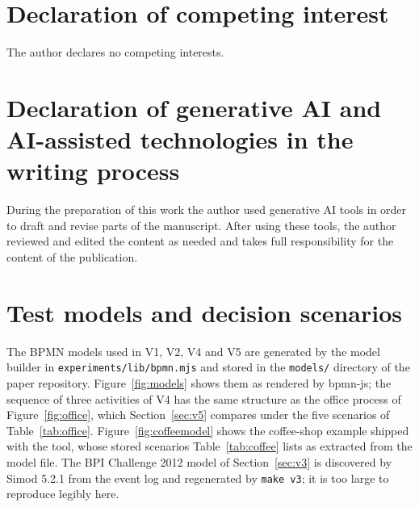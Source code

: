 \documentclass[preprint,12pt,nonatbib]{elsarticle}
\begin{document}
\section*{Declaration of competing interest}
The author declares no competing interests.

\section*{Declaration of generative AI and AI-assisted technologies in the writing process}
During the preparation of this work the author used generative AI tools in order to draft and revise parts of the manuscript. After using these tools, the author reviewed and edited the content as needed and takes full responsibility for the content of the publication.

\FloatBarrier



\clearpage
\appendix
\setcounter{figure}{0}
\setcounter{table}{0}
\section{Test models and decision scenarios}
\label{app:models}
The BPMN models used in V1, V2, V4 and V5 are generated by the model builder in \texttt{experiments/lib/bpmn.mjs} and stored in the \texttt{models/} directory of the paper repository. Figure~\ref{fig:models} shows them as rendered by bpmn-js; the sequence of three activities of V4 has the same structure as the office process of Figure~\ref{fig:office}, which Section~\ref{sec:v5} compares under the five scenarios of Table~\ref{tab:office}. Figure~\ref{fig:coffeemodel} shows the coffee-shop example shipped with the tool, whose stored scenarios Table~\ref{tab:coffee} lists as extracted from the model file. The BPI Challenge 2012 model of Section~\ref{sec:v3} is discovered by Simod 5.2.1 from the event log and regenerated by \texttt{make v3}; it is too large to reproduce legibly here.
\end{document}
